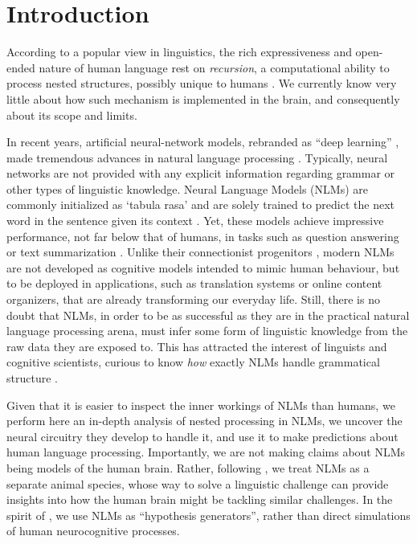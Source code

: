 \section{Introduction}

According to a popular view in linguistics, the rich expressiveness
and open-ended nature of human language rest on \emph{recursion}, a
computational ability to process nested structures, possibly unique to
humans \citep{Chomsky:1957, Hauser:etal:2002, Dehaene:etal:2015}. We
currently know very little about how such mechanism is implemented in
the brain, and consequently about its scope and limits.

In recent years, artificial neural-network models, rebranded as ``deep learning'' \citep{LeCun:etal:2015}, made tremendous advances in natural language processing \citep{Goldberg:2017}. Typically, neural networks are not provided with any explicit information regarding grammar or other types of linguistic knowledge. Neural Language Models (NLMs) are commonly initialized as `tabula rasa' and are solely trained to predict the next word in the sentence given its context \citep{Elman:1990}. Yet, these models achieve impressive performance, not far below that of humans, in tasks such as question answering or text summarization \citep{Radford:etal:2019}. Unlike their connectionist progenitors \cite{Rumelhart:etal:1986,Rumelhart:etal:1986b}, modern NLMs are not developed as cognitive models intended to mimic human behaviour, but to be deployed in applications, such as translation systems or online content organizers, that are already transforming our everyday life. Still, there is no doubt that NLMs, in order to be as successful as they are in the practical natural language processing arena, must infer some form of linguistic knowledge from the raw data they are exposed to. This has attracted the interest of linguists and cognitive scientists, curious to know  \textit{how} exactly NLMs handle grammatical structure \citep[see][for a survery]{Linzen:Baroni:2020}.

Given that it is easier to inspect the inner workings of NLMs than humans, we perform here an in-depth analysis of nested processing in NLMs, we uncover the neural circuitry they develop to handle it, and use it to make predictions about human language processing. Importantly, we are not making claims about NLMs being models of the human brain. Rather, following \citet{McCloskey:1991}, we treat NLMs as a separate animal species, whose way to solve a linguistic challenge can provide insights into how the human brain might be tackling similar challenges. In the spirit of \citet{Cichy:Kaiser:2019}, we use NLMs as ``hypothesis generators'', rather than direct simulations of human neurocognitive processes.

